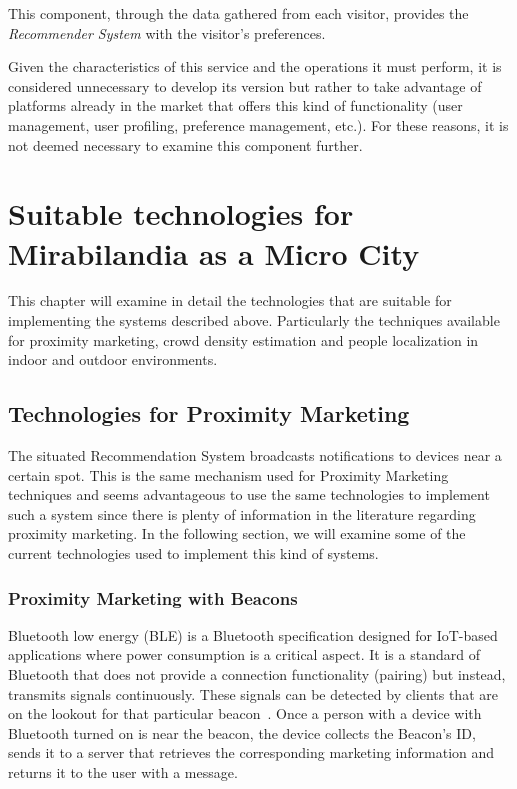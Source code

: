 This component, through the data gathered from each visitor, provides the \textit{Recommender System} with the visitor's preferences.

Given the characteristics of this service and the operations it must perform, it is considered unnecessary to develop its version but rather to take
advantage of platforms already in the market that offers this kind of functionality (user management, user profiling, preference management, etc.).
For these reasons, it is not deemed necessary to examine this component further.

\section{Suitable technologies for Mirabilandia as a Micro City}
This chapter will examine in detail the technologies that are suitable for implementing the systems described above.
Particularly the techniques available for proximity marketing, crowd density estimation and people localization in indoor and outdoor environments.

\subsection{Technologies for Proximity Marketing}\label{sec:proximity-marketing-technologies}
The situated Recommendation System broadcasts notifications to devices near a certain spot.
This is the same mechanism used for Proximity Marketing techniques and seems advantageous to use the same technologies to implement such a system since there is plenty of information in the literature regarding proximity marketing.
In the following section, we will examine some of the current technologies used to implement this kind of systems.

\subsubsection{Proximity Marketing with Beacons}\label{sec:proximity-marketing-with-beacons}
Bluetooth low energy (BLE) is a Bluetooth specification designed for IoT-based applications where power consumption is a critical aspect.
It is a standard of Bluetooth that does not provide a connection functionality (pairing) but instead, transmits signals continuously.
These signals can be detected by clients that are on the lookout for that particular beacon~\cite{muddinagiri2020implementation}.
Once a person with a device with Bluetooth turned on is near the beacon, the device collects the Beacon's ID, sends it to a server that retrieves the corresponding marketing information and returns it to the user with a message.

